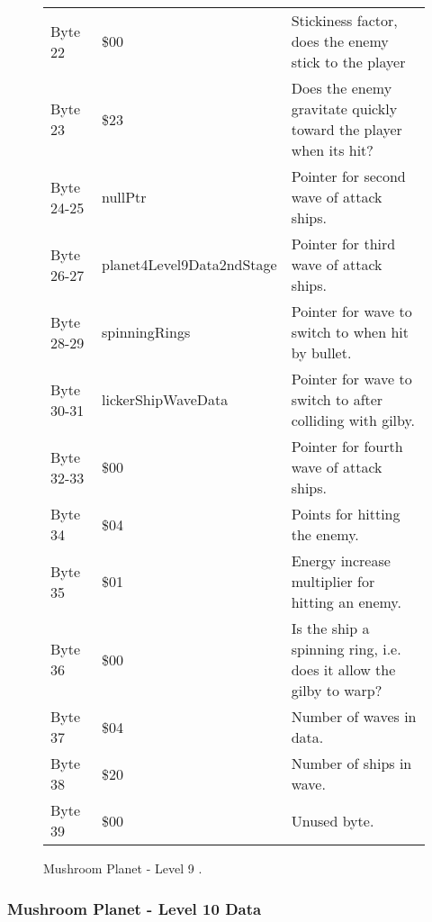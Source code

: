 \begin{figure}[H]
{\begin{adjustbox}{width=12cm}
\begin{tabular}{lll}
 Byte 22    & \$00                       & Stickiness factor, does the enemy stick to the player               \\
 Byte 23    & \$23                       & Does the enemy gravitate quickly toward the player when its hit?    \\
 Byte 24-25 & nullPtr                   & Pointer for second wave of attack ships.                            \\
 Byte 26-27 & planet4Level9Data2ndStage & Pointer for third wave of attack ships.                             \\
 Byte 28-29 & spinningRings             & Pointer for wave to switch to when hit by bullet.                   \\
 Byte 30-31 & lickerShipWaveData        & Pointer for  wave to switch to after colliding with gilby.          \\
 Byte 32-33 & \$00                       & Pointer for fourth wave of attack ships.                            \\
 Byte 34    & \$04                       & Points for hitting the enemy.                                       \\
 Byte 35    & \$01                       & Energy increase multiplier for hitting an enemy.                    \\
 Byte 36    & \$00                       & Is the ship a spinning ring, i.e. does it allow the gilby to warp?  \\
 Byte 37    & \$04                       & Number of waves in data.                                            \\
 Byte 38    & \$20                       & Number of ships in wave.                                            \\
 Byte 39    & \$00                       & Unused byte.                                                        \\
\bottomrule
\end{tabular}

  \end{adjustbox}

  }\caption*{Mushroom Planet - Level 9
.}
\end{figure}

\clearpage
\subsubsection{Mushroom Planet - Level 10 Data}

